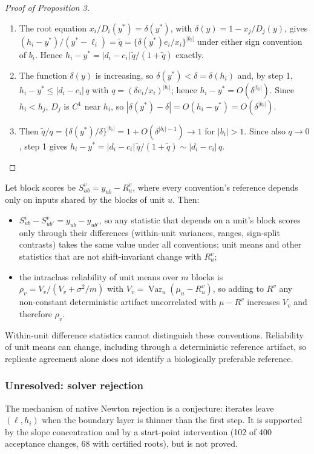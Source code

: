 \documentclass[11pt]{article}
\begin{document}
\begin{proof}[Proof of Proposition 3]
\begin{enumerate}
\item The root equation $x_i/D_i(y^*)=\delta(y^*)$, with $\delta(y)=1-x_j/D_j(y)$, gives $(h_i-y^*)/(y^*-\ell_i)=\tilde q=\{\delta(y^*)e_i/x_i\}^{|b_i|}$ under either sign convention of $b_i$. Hence $h_i-y^*=|d_i-c_i|\,\tilde q/(1+\tilde q)$ exactly.
\item The function $\delta(y)$ is increasing, so $\delta(y^*)<\delta=\delta(h_i)$ and, by step 1, $h_i-y^*\le|d_i-c_i|\,q$ with $q=(\delta e_i/x_i)^{|b_i|}$; hence $h_i-y^*=O(\delta^{|b_i|})$. Since $h_i<h_j$, $D_j$ is $C^1$ near $h_i$, so $|\delta(y^*)-\delta|=O(h_i-y^*)=O(\delta^{|b_i|})$.
\item Then $\tilde q/q=\{\delta(y^*)/\delta\}^{|b_i|}=1+O(\delta^{|b_i|-1})\to1$ for $|b_i|>1$. Since also $q\to0$, step 1 gives $h_i-y^*=|d_i-c_i|\,\tilde q/(1+\tilde q)\sim|d_i-c_i|\,q$.\qedhere
\end{enumerate}
\end{proof}
\setcounter{proposition}{4}
\begin{proposition}\label{prop:replicates}
Let block scores be $S^v_{ub}=y_{ub}-R^v_u$, where every convention's reference depends only on inputs shared by the blocks of unit $u$. Then:

\begin{itemize}
\item $S^v_{ub}-S^v_{ub'}=y_{ub}-y_{ub'}$, so any statistic that depends on a unit's block scores only through their differences (within-unit variances, ranges, sign-split contrasts) takes the same value under all conventions; unit means and other statistics that are not shift-invariant change with $R^v_u$;
\item the intraclass reliability of unit means over $m$ blocks is $\rho_v=V_v/(V_v+\sigma^2/m)$ with $V_v=\operatorname{Var}_u(\mu_u-R^v_u)$, so adding to $R^v$ any non-constant deterministic artifact uncorrelated with $\mu-R^v$ increases $V_v$ and therefore $\rho_v$.
\end{itemize}
\end{proposition}
Within-unit difference statistics cannot distinguish these conventions. Reliability of unit means can change, including through a deterministic reference artifact, so replicate agreement alone does not identify a biologically preferable reference.

\subsubsection*{Unresolved: solver rejection} The mechanism of native Newton rejection is a conjecture: iterates leave $(\ell,h_i)$ when the boundary layer is thinner than the first step. It is supported by the slope concentration and by a start-point intervention (102 of 400 acceptance changes, 68 with certified roots), but is not proved.
\end{document}

